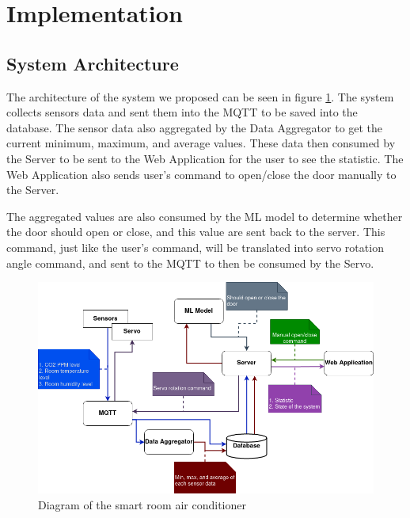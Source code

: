 \section{Implementation}

\subsection{System Architecture}
The architecture of the system we proposed can be seen in
figure \ref{iot-diagram}.
The system collects sensors data and sent them into the MQTT
to be saved into the database. The sensor data also aggregated
by the Data Aggregator to get the current minimum, maximum,
and average values. These data then consumed by the Server to
be sent to the Web Application for the user to see the
statistic. The Web Application also sends user's command to
open/close the door manually to the Server.

The aggregated values are also consumed by the ML model to
determine whether the door should open or close, and this
value are sent back to the server. This command, just like
the user's command, will be translated into servo rotation
angle command, and sent to the MQTT to then be consumed by
the Servo.

\begin{figure}
      \centering
      \includegraphics[scale=0.5]{resources/iot-diagram.png}
      \caption{Diagram of the smart room air conditioner}
      \label{iot-diagram}
\end{figure}

